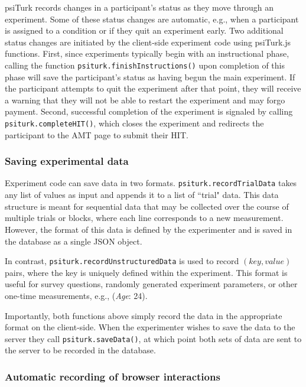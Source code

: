 \documentclass[twocolumn]{svjour3}          %
\begin{document}
psiTurk records changes in a participant's status as they move through an experiment. 
Some of these status changes are automatic, e.g., when a participant is assigned to a condition or if they quit an experiment early. 
Two additional status changes are initiated by the client-side experiment code using psiTurk.js functions.
First, since experiments typically begin with an instructional phase, calling the function \texttt{psiturk.finishInstructions()} upon completion of this phase will save the participant's status as having begun the main experiment.
If the participant attempts to quit the experiment after that point, they will receive a warning that they will not be able to restart the experiment and may forgo payment.
Second, successful completion of the experiment is signaled by calling \texttt{psiturk.completeHIT()}, which closes the experiment and redirects the participant to the AMT page to submit their HIT.

\subsubsection{Saving experimental data} 

Experiment code can save data in two formats.
\texttt{psiturk.recordTrialData} takes any list of values as input and appends it to a list of ``trial" data.
This data structure is meant for sequential data that may be collected over the course of multiple trials or blocks, where each line corresponds to a new measurement.
However, the format of this data is defined by the experimenter and is saved in the database as a single JSON object.

In contrast, \texttt{psiturk.recordUnstructuredData} is used to record $(key, value)$ pairs, where the key is uniquely defined within the experiment.
This format is useful for survey questions, randomly generated experiment parameters, or other one-time measurements, e.g., (\emph{Age}: 24).

Importantly, both functions above simply record the data in the appropriate format on the client-side.
When the experimenter wishes to save the data to the server they call \texttt{psiturk.saveData()}, at which point both sets of data are sent to the server to be recorded in the database.

\subsubsection{Automatic recording of browser interactions}
 
\end{document}
